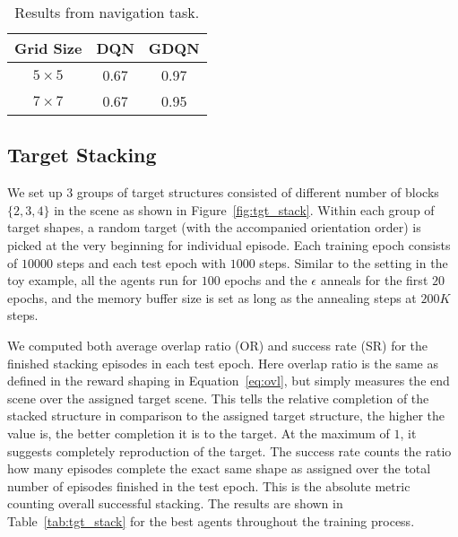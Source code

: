 \documentclass{article} %
\begin{document}
\begin{table}
\centering
\begin{tabular}{c|cc}
\toprule
Grid Size & DQN  & GDQN \\ 
\midrule
$5\times 5$       & 0.67 & 0.97 \\
$7\times 7$       & 0.67 & 0.95 \\
\bottomrule
\end{tabular}
\caption{Results from navigation task.}
\label{tab:gridworld_result}
\end{table}\subsection{Target Stacking}
We set up $3$ groups of target structures consisted of different number of blocks $\{2,3,4\}$ in the scene as shown in Figure~\ref{fig:tgt_stack}. Within each group of target shapes, a random target (with the accompanied orientation order) is picked at the very beginning for individual episode. Each training epoch consists of $10000$ steps and each test epoch with $1000$ steps. Similar to the setting in the toy example, all the agents run for $100$ epochs and the $\epsilon$ anneals for the first $20$ epochs, and the memory buffer size is set as long as the annealing steps at $200K$ steps. 

We computed both average overlap ratio (OR) and success rate (SR) for the finished stacking episodes in each test epoch. Here overlap ratio is the same as defined in the reward shaping in Equation~\ref{eq:ovl}, but simply measures the end scene over the assigned target scene. This tells the relative completion of the stacked structure in comparison to the assigned target structure, the higher the value is, the better completion it is to the target. At the maximum of $1$, it suggests completely reproduction of the target. The success rate counts the ratio how many episodes complete the exact same shape as assigned over the total number of episodes finished in the test epoch. This is the absolute metric counting overall successful stacking. The results are shown in Table~\ref{tab:tgt_stack} for the best agents throughout the training process.
\end{document}

